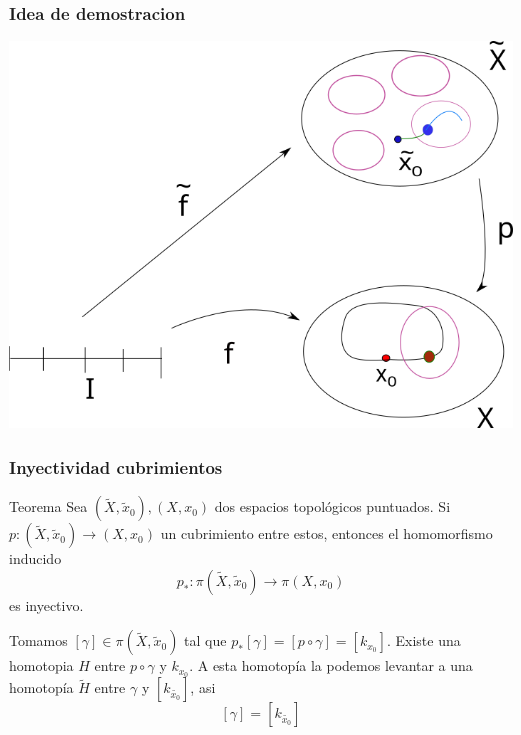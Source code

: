 \documentclass[xetex,mathserif,serif]{beamer}
\begin{document}
  \begin{frame}
    \frametitle{Idea de demostracion}
    \begin{center}
        \includegraphics[scale=0.4]{./imag/levantamientos2.png}
    \end{center}
  \end{frame}

  \begin{frame}
    \frametitle{Inyectividad cubrimientos}
    \begin{block}{Teorema}
      Sea \(\left( \tilde X, \tilde x_0 \right), \left( X, x_0 \right)\)
      dos espacios topológicos puntuados. Si \(p : \left( \tilde X,
        \tilde x_0 \right) \to \left( X, x_0 \right)\) un cubrimiento
      entre estos, entonces el homomorfismo inducido
      \[ p_* : \pi \left( \tilde X, \tilde x_0 \right) \longrightarrow
        \pi \left( X, x_0 \right)\] es inyectivo.
    \end{block}
    \pause
    \begin{block}{}
      Tomamos \([\gamma] \in \pi(\tilde X, \tilde x_0)\) tal que \(p_*
      [\gamma] = [p \circ \gamma] = [k_{x_0}]\). Existe una homotopia
      \(H\) entre \(p \circ \gamma\) y \(k_{x_0}\). A esta homotopía la
      podemos levantar a una homotopía \(\tilde H\) entre \(\gamma\) y
      \([k_{\tilde {x_0}}]\), asi
      \[ [\gamma]= [k_{\tilde {x_0}}]\]
    \end{block}
  \end{frame}
\end{document}
